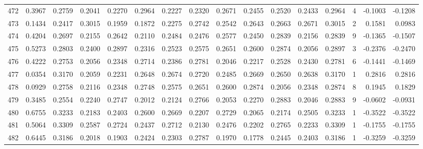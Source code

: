 \begin{tabular}{lrrrrrrrrrrrrrrr}
472 &      0.3967 &  0.2759 &  0.2041 &  0.2270 &  0.2964 &  0.2227 &  0.2320 &  0.2671 &  0.2455 &  0.2520 &   0.2433 &     0.2964 &      4 &                   -0.1003 &                    -0.1208 \\
473 &      0.1434 &  0.2417 &  0.3015 &  0.1959 &  0.1872 &  0.2275 &  0.2742 &  0.2542 &  0.2643 &  0.2663 &   0.2671 &     0.3015 &      2 &                    0.1581 &                     0.0983 \\
474 &      0.4204 &  0.2697 &  0.2155 &  0.2642 &  0.2110 &  0.2484 &  0.2476 &  0.2577 &  0.2450 &  0.2839 &   0.2156 &     0.2839 &      9 &                   -0.1365 &                    -0.1507 \\
475 &      0.5273 &  0.2803 &  0.2400 &  0.2897 &  0.2316 &  0.2523 &  0.2575 &  0.2651 &  0.2600 &  0.2874 &   0.2056 &     0.2897 &      3 &                   -0.2376 &                    -0.2470 \\
476 &      0.4222 &  0.2753 &  0.2056 &  0.2348 &  0.2714 &  0.2386 &  0.2781 &  0.2046 &  0.2217 &  0.2528 &   0.2430 &     0.2781 &      6 &                   -0.1441 &                    -0.1469 \\
477 &      0.0354 &  0.3170 &  0.2059 &  0.2231 &  0.2648 &  0.2674 &  0.2720 &  0.2485 &  0.2669 &  0.2650 &   0.2638 &     0.3170 &      1 &                    0.2816 &                     0.2816 \\
478 &      0.0929 &  0.2758 &  0.2116 &  0.2348 &  0.2748 &  0.2575 &  0.2651 &  0.2600 &  0.2874 &  0.2056 &   0.2348 &     0.2874 &      8 &                    0.1945 &                     0.1829 \\
479 &      0.3485 &  0.2554 &  0.2240 &  0.2747 &  0.2012 &  0.2124 &  0.2766 &  0.2053 &  0.2270 &  0.2883 &   0.2046 &     0.2883 &      9 &                   -0.0602 &                    -0.0931 \\
480 &      0.6755 &  0.3233 &  0.2183 &  0.2403 &  0.2600 &  0.2669 &  0.2207 &  0.2729 &  0.2065 &  0.2174 &   0.2505 &     0.3233 &      1 &                   -0.3522 &                    -0.3522 \\
481 &      0.5064 &  0.3309 &  0.2587 &  0.2724 &  0.2437 &  0.2712 &  0.2130 &  0.2476 &  0.2202 &  0.2765 &   0.2233 &     0.3309 &      1 &                   -0.1755 &                    -0.1755 \\
482 &      0.6445 &  0.3186 &  0.2018 &  0.1903 &  0.2424 &  0.2303 &  0.2787 &  0.1970 &  0.1778 &  0.2445 &   0.2403 &     0.3186 &      1 &                   -0.3259 &                    -0.3259 \\

\end{tabular}
